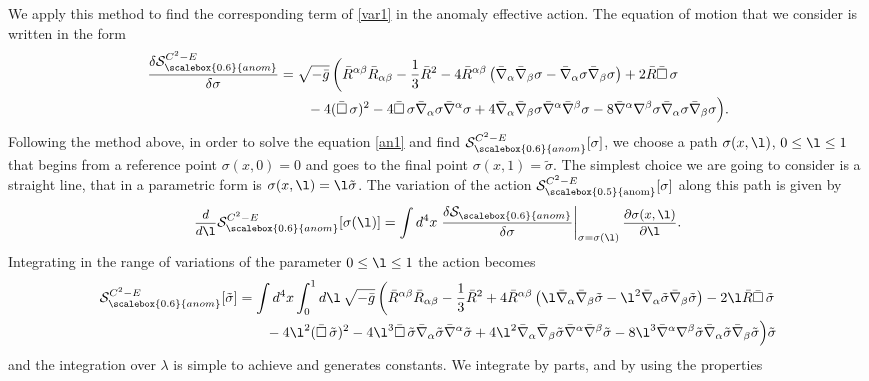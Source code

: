 \documentclass[a4paper,11pt,openright,twoside]{book}
\let\a=\alpha   \let\b=\beta   \let\g=\gamma   \let\d=\delta
\let\s=\sigma  \let\t=\tau     \let\u=\upsilon \let\f=\phi
\newcommand{\sdfrac}[2]{\mbox{\small$\displaystyle\frac{#1}{#2}$}}
\numberwithin{equation}{section}
\begin{document}
{{{{ We apply this method to find the corresponding term of \eqref{var1} in the anomaly effective action. The equation of motion that we consider is written in the form
	\begin{align}
		\frac{\d\mathcal{S}_{\scalebox{0.6}{anom}}^{C^2-E}}{\d\s}&=\sqrt{-\bar g}\left(\bar R^{\a\b}\bar R_{\a\b}-\frac{1}{3}\bar R^2 -4\bar R^{\a\b}\left(\bar\nabla_{\a}\bar\nabla_\b\s-\bar\nabla_{\a}\s\bar\nabla_\b\s\right)+2\bar R\bar\square\,\s \right.\notag\\
		&\qquad -4(\bar\square\,\s)^2-4\bar\square\,\s\bar\nabla_\a\s\bar\nabla^\a\s+4\bar\nabla_\a\bar\nabla_\b\s\bar\nabla^\a\bar\nabla^\b\s-8\bar\nabla^\a\nabla^\b\s\bar\nabla_\a\s\bar\nabla_\b\s\Big)\label{an1}.
	\end{align}
	Following the method above, in order to solve the equation \eqref{an1} and find $\mathcal{S}_{\scalebox{0.6}{anom}}^{C^2-E}[\s]$, we choose a path $\s(x,\l)$, $0\le\l\le1$ that begins from a reference point $\s(x,0)=0$ and goes to the final point $\s(x,1)=\tilde\s$. The simplest choice we are going to consider is a straight line, that in a parametric form is $\s(x,\l)=\l\tilde\s$. The variation of the action $\mathcal{S}_{\scalebox{0.5}{\text{anom}}}^{C^2-E}[\s]$ along this path is given by
	\begin{equation}
		\sdfrac{d}{d\l}\mathcal{S}_{\scalebox{0.6}{anom}}^{C^2-E}[\s(\l)]=\int d^4x\left.\frac{\d\mathcal{S}_{\scalebox{0.6}{anom}}}{\d \s}\right|_{\s=\s(\l)}\sdfrac{\partial \s(x,\l)}{\partial \l}.
	\end{equation}
	Integrating in the range of variations of the parameter $0\le\l\le1$ the action becomes
	\begin{align}
		\mathcal{S}_{\scalebox{0.6}{anom}}^{C^2-E}[\tilde{\s}]&=\int d^4x\int^1_0d\l\, \sqrt{-\bar g}\left(\bar R^{\a\b}\bar R_{\a\b}-\frac{1}{3}\bar R^2 +4\bar R^{\a\b}\left(\l\bar\nabla_{\a}\bar\nabla_\b\tilde\s-\l^2\bar\nabla_{\a}\tilde\s\bar\nabla_\b\tilde\s\right)-2\l\bar R\bar\square\,\tilde\s \right.\notag\\
		&\qquad -4\l^2(\bar\square\,\tilde\s)^2-4\l^3\bar\square\,\tilde\s\bar\nabla_\a\tilde\s\bar\nabla^\a\tilde\s+4\l^2\bar\nabla_\a\bar\nabla_\b\tilde\s\bar\nabla^\a\bar\nabla^\b\tilde\s-8\l^3\bar\nabla^\a\nabla^\b\tilde\s\bar\nabla_\a\tilde\s\bar\nabla_\b\tilde\s\Big)\tilde\s\label{CE}
	\end{align}
	and the integration over $\lambda$ is simple to achieve and generates constants. We integrate by parts, and by using the properties
	\begin{equation}

\end{equation}}}}}
\end{document}
